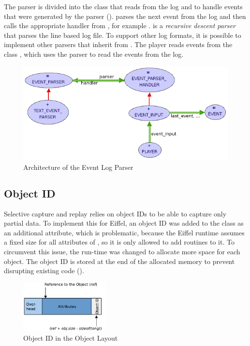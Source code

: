 The parser is divided into the class  that reads from the log and  to handle events that were generated by the parser ().  parses the next event from the log and then calls the appropriate handler from , for example .  
 is a \emph{recursive descent parser} \cite{aho86} that parses the line based log file. To support other log formats, it is possible to implement other parsers that inherit from .
The player reads events from the class , which uses the parser to read the events from the log.

\begin{figure}[ht]
  \centering
  \includegraphics[width=1\textwidth]{illustrations/implementation_parser.png}
  \caption{Architecture of the Event Log Parser}
  \label{fig:implementation_parser}
\end{figure}


\subsection{Object ID}
Selective capture and replay relies on object IDs to be able to capture only partial data. To implement this for Eiffel, an object ID was added to the class  as an additional attribute, which is problematic, because the Eiffel runtime assumes a fixed size for all attributes of , so it is only allowed to add routines to it. To circumvent this issue, the run-time was  changed to allocate more space for each object. The object ID is stored at the end of the allocated memory to prevent disrupting existing code ().
\begin{figure}[ht]
  \centering
  \includegraphics[width=0.4\textwidth]{illustrations/any_object_id}
  \caption{Object ID in the Object Layout}
  \label{fig:any_object_id}
\end{figure}

